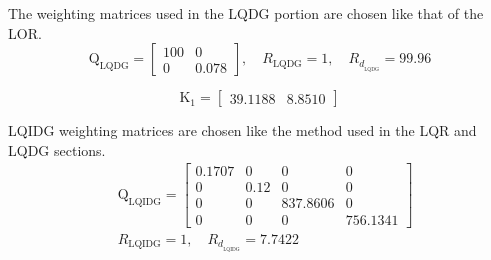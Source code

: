 \documentclass[conference]{IEEEtran}
\begin{document}
The weighting matrices used in the LQDG portion are chosen like that of the LOR.
\begin{equation}
	\boldsymbol{\mathrm{Q}}_{\text{LQDG}} = \begin{bmatrix}
		100 & 0\\
		0 & 0.078
	\end{bmatrix}, \quad R_{{\text{LQDG}}} =  1, \quad R_{d_{_\text{LQDG}}} =  99.96
\end{equation}

		

\begin{equation}
    \boldsymbol{\mathrm{K_{1}}} = \begin{bmatrix}
        39.1188   & 8.8510
    \end{bmatrix}
\end{equation}

LQIDG weighting matrices are chosen like the method used in the LQR and LQDG sections.
\begin{equation}
    \begin{split}
        &\boldsymbol{\mathrm{Q_{{\text{LQIDG}}}}} = \begin{bmatrix}
            0.1707 &0& 0& 0\\
            0 &  0.12 & 0 &0 \\
            0 & 0 & 837.8606 & 0\\
            0 & 0 & 0 & 756.1341
        \end{bmatrix}
        \\[1em]
        &R_{{\text{LQIDG}}} =  1, \quad R_{d_{_\text{LQIDG}}} =  7.7422
    \end{split}
\end{equation}
\end{document}
